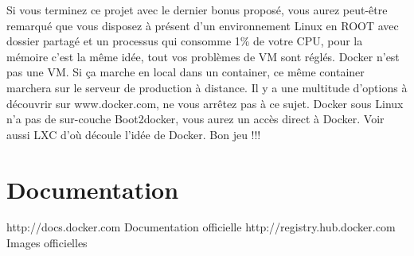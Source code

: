 \documentclass{42}
\begin{document}
Si vous terminez ce projet avec le dernier bonus proposé, vous aurez peut-être remarqué que vous disposez à présent d’un environnement Linux en ROOT avec dossier partagé et un processus qui consomme 1\% de votre CPU, pour la mémoire c’est la même idée, tout vos problèmes de VM sont réglés.
\newline
\newline
Docker n’est pas une VM.
\newline
\newline
Si ça marche en local dans un container, ce même container marchera sur le serveur de production à distance.
\newline
\newline
Il y a une multitude d’options à découvrir sur www.docker.com, ne vous arrêtez pas à ce sujet.
Docker sous Linux n’a pas de sur-couche Boot2docker, vous aurez un accès direct à Docker.
\newline
\newline
Voir aussi LXC d’où découle l'idée de Docker.
\newline
\newline
\newline
\newline
Bon jeu !!!

\section{Documentation}
\info
{
	http://docs.docker.com Documentation officielle 
	\newline
	http://registry.hub.docker.com Images officielles 
}



\end{document}
